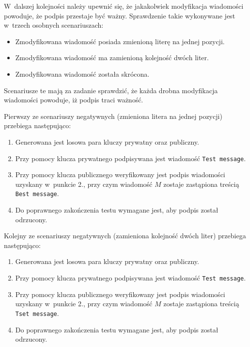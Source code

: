 \documentclass{article}
\begin{document}
        W~dalszej kolejności należy upewnić się, że jakakolwiek modyfikacja wiadomości powoduje, że podpis przestaje być ważny. Sprawdzenie takie wykonywane jest w~trzech osobnych scenariuszach:
        
        \begin{itemize}
            \item Zmodyfikowana wiadomość posiada zmienioną literę na jednej pozycji.
            \item Zmodyfikowana wiadomość ma zamienioną kolejność dwóch liter.
            \item Zmodyfikowana wiadomość została skrócona.
        \end{itemize}
        
\noindent Scenariusze te mają za zadanie sprawdzić, że każda drobna modyfikacja wiadomości powoduje, iż podpis traci ważność.

        Pierwszy ze scenariuszy negatywnych (zmieniona litera na jednej pozycji) przebiega następująco:
        
        \begin{enumerate}
            \item Generowana jest losowa para kluczy prywatny oraz publiczny.
            \item Przy pomocy klucza prywatnego podpisywana jest wiadomość \verb+Test message+.
            \item Przy pomocy klucza publicznego weryfikowany jest podpis wiadomości uzyskany w~punkcie 2., przy czym wiadomość $M$ zostaje zastąpiona treścią \verb+Best message+.
            \item Do poprawnego zakończenia testu wymagane jest, aby podpis został odrzucony.
        \end{enumerate}

        Kolejny ze scenariuszy negatywnych (zamieniona kolejność dwóch liter) przebiega następująco:
        
        \begin{enumerate}
            \item Generowana jest losowa para kluczy prywatny oraz publiczny.
            \item Przy pomocy klucza prywatnego podpisywana jest wiadomość \verb+Test message+.
            \item Przy pomocy klucza publicznego weryfikowany jest podpis wiadomości uzyskany w~punkcie 2., przy czym wiadomość $M$ zostaje zastąpiona treścią \verb+Tset message+.
            \item Do poprawnego zakończenia testu wymagane jest, aby podpis został odrzucony.
        \end{enumerate}        
        
\end{document}

